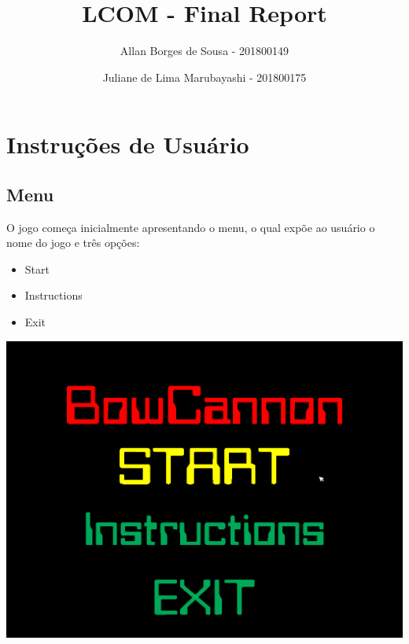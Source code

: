 \documentclass[12pt]{article}
\title{LCOM - Final Report}
\author{Allan Borges de Sousa - 201800149 
\and Juliane de Lima Marubayashi - 201800175}
\begin{document}
\maketitle
\newpage
\section{Instruções de Usuário}
\subsection{Menu}
O jogo começa inicialmente apresentando o menu, o qual expõe ao usuário o nome do jogo e três opções: 
\begin{itemize}
    \item Start
    \item Instructions
    \item Exit
\end{itemize}

\begin{center}
    \includegraphics[width = 14cm]{Menu.png}
\end{center}
\newpage
\end{document}

